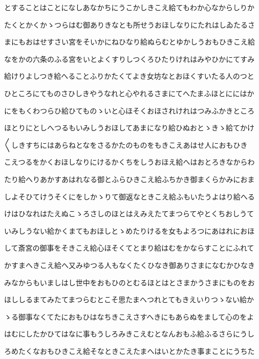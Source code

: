 \documentclass[a4paper,11pt,landscape]{ltjtarticle}
\begin{document}
とすることはことになしあなかちにうこかしきこえ給てもわか心なからしりか
\par\medskip
たくとかくかゝつらはむ御ありきなとも所せうおほしなりにたれはしゐたるさ
\par\medskip
まにもおはせすさい宮をそいかにねひなり給ぬらむとゆかしうおもひきこえ給
\par\medskip
なをかの六条のふる宮をいとよくすりしつくろひたりけれはみやひかにてすみ
\par\medskip
給けりよしつき給へることふりかたくてよき女坊なとおほくすいたる人のつと
\par\medskip
ひところにてものさひしきやうなれと心やれるさまにてへたまふほとににはか
\par\medskip
にをもくわつらひ給ひてものゝいと心ほそくおほされけれはつみふかきところ
\par\medskip
ほとりにとしへつるもいみしうおほしてあまになり給ひぬおとゝきゝ給てかけ
\par\medskip
〱しきすちにはあらねとなをさるかたのものをもきこえあはせ人におもひき
\par\medskip
こえつるをかくおほしなりにけるかくちをしうおほえ給へはおとろきなからわ
\par\medskip
たり給へりあかすあはれなる御とふらひきこえ給ふちかき御まくらかみにおま
\par\medskip
しよそひてけうそくにをしかゝりて御返なときこえ給ふもいたうよはり給へる
\par\medskip
けはひなれはたえぬこゝろさしのほとはえみえたてまつらてやとくちおしうて
\par\medskip
いみしうない給かくまてもおほしとゝめたりけるを女もよろつにあはれにおほ
\par\medskip
して斎宮の御事をそきこえ給心ほそくてとまり給はむをかならすことにふれて
\par\medskip
かすまへきこえ給へ又みゆつる人もなくたくひなき御ありさまになむかひなき
\par\medskip
みなからもいましはし世中をおもひのとむるほとはとさまかうさまにものをお
\par\medskip
ほししるまてみたてまつらむとこそ思たまへつれとてもきえいりつゝない給か
\par\medskip
ゝる御事なくてたにおもひはなちきこえさすへきにもあらぬをまして心のをよ
\par\medskip
はむにしたかひてはなに事もうしろみきこえむとなんおもふ給ふるさらにうし
\par\medskip
ろめたくなおもひきこえ給そなときこえたまへはいとかたき事まことにうちた
\par\medskip
\end{document}
